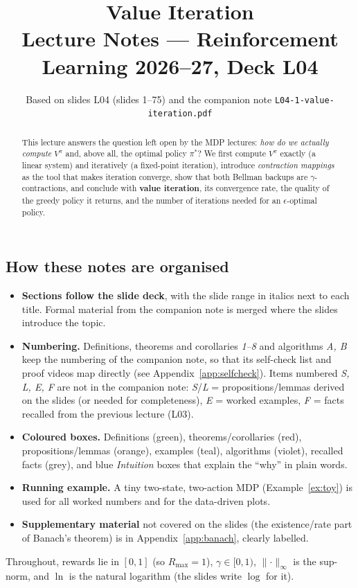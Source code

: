 \documentclass[11pt,a4paper]{article}
\title{\textbf{Value Iteration}\\[2pt]\large Lecture Notes --- Reinforcement Learning 2026--27, Deck L04}
\author{Based on slides L04 (slides 1--75) and the companion note \texttt{L04-1-value-iteration.pdf}}
\date{}
\newcommand{\norm}[1]{\lVert #1\rVert_\infty}
\theoremstyle{plain}
\theoremstyle{definition}
\theoremstyle{remark}
\begin{document}
\maketitle

\begin{abstract}\noindent
This lecture answers the question left open by the MDP lectures: \emph{how do we actually compute} $V^\pi$ and, above all, the optimal policy $\pi^*$?
We first compute $V^\pi$ exactly (a linear system) and iteratively (a fixed-point iteration), introduce \emph{contraction mappings} as the tool that makes iteration converge, show that both Bellman backups are $\gamma$-contractions, and conclude with \textbf{value iteration}, its convergence rate, the quality of the greedy policy it returns, and the number of iterations needed for an $\epsilon$-optimal policy.
\end{abstract}

\subsection*{How these notes are organised}
\begin{itemize}
  \item \textbf{Sections follow the slide deck}, with the slide range in italics next to each title. Formal material from the companion note is merged where the slides introduce the topic.
  \item \textbf{Numbering.} Definitions, theorems and corollaries \emph{1--8} and algorithms \emph{A, B} keep the numbering of the companion note, so that its self-check list and proof videos map directly (see Appendix~\ref{app:selfcheck}). Items numbered \emph{S, L, E, F} are not in the companion note: \emph{S}/\emph{L} = propositions/lemmas derived on the slides (or needed for completeness), \emph{E} = worked examples, \emph{F} = facts recalled from the previous lecture (L03).
  \item \textbf{Coloured boxes.} Definitions (green), theorems/corollaries (red), propositions/lemmas (orange), examples (teal), algorithms (violet), recalled facts (grey), and blue \emph{Intuition} boxes that explain the ``why'' in plain words.
  \item \textbf{Running example.} A tiny two-state, two-action MDP (Example~\ref{ex:toy}) is used for all worked numbers and for the data-driven plots.
  \item \textbf{Supplementary material} not covered on the slides (the existence/rate part of Banach's theorem) is in Appendix~\ref{app:banach}, clearly labelled.
\end{itemize}
Throughout, rewards lie in $[0,1]$ (so $R_{\max}=1$), $\gamma\in[0,1)$, $\norm{\cdot}$ is the sup-norm, and $\ln$ is the natural logarithm (the slides write $\log$ for it).
\end{document}
